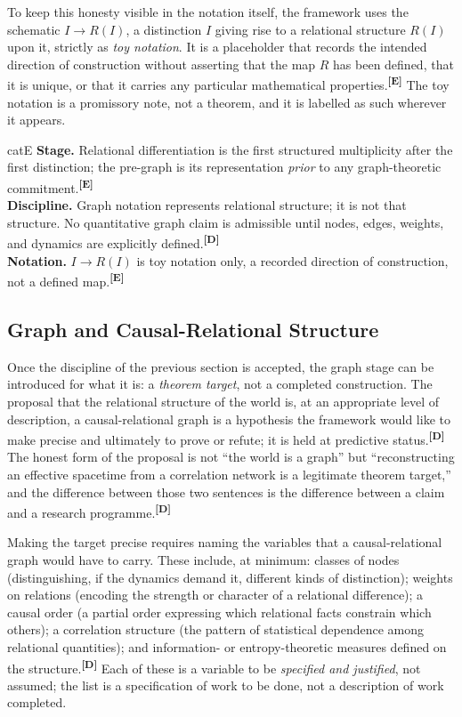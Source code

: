 \documentclass[12pt,a4paper,twoside]{article}
\theoremstyle{plain}
\theoremstyle{definition}
\theoremstyle{remark}
\newcommand{\catmark}[1]{\textsuperscript{\textsf{\textbf{[#1]}}}}
\begin{document}
To keep this honesty visible in the notation itself, the framework uses the schematic $I \to R(I)$, a distinction $I$ giving rise to a relational structure $R(I)$ upon it, strictly as \emph{toy notation}. It is a placeholder that records the intended direction of construction without asserting that the map $R$ has been defined, that it is unique, or that it carries any particular mathematical properties.\catmark{E} The toy notation is a promissory note, not a theorem, and it is labelled as such wherever it appears.

\begin{evidencebox}{catE}
\textbf{Stage.} Relational differentiation is the first structured multiplicity after the first distinction; the pre-graph is its representation \emph{prior} to
any graph-theoretic commitment.\catmark{E}\\[0.3em]
\textbf{Discipline.} Graph notation represents relational structure; it is not that structure. No quantitative graph claim is admissible until nodes, edges,
weights, and dynamics are explicitly defined.\catmark{D}\\[0.3em]
\textbf{Notation.} $I \to R(I)$ is toy notation only, a recorded direction of construction, not a defined map.\catmark{E}
\end{evidencebox}

\subsection{Graph and Causal-Relational Structure}
\label{subsec:graph-causal}

Once the discipline of the previous section is accepted, the graph stage can be introduced for what it is: a \emph{theorem target}, not a completed construction. The proposal that the relational structure of the world is, at an appropriate level of description, a causal-relational graph is a hypothesis the framework would like to make precise and ultimately to prove or refute; it is held at predictive status.\catmark{D} The honest form of the proposal is not ``the world is a graph'' but ``reconstructing an effective spacetime from a correlation network is a legitimate theorem target,'' and the difference between those two sentences is the difference between a claim and a research programme.\catmark{D}

Making the target precise requires naming the variables that a causal-relational graph would have to carry. These include, at minimum: classes of nodes (distinguishing, if the dynamics demand it, different kinds of distinction); weights on relations (encoding the strength or character of a relational difference); a causal order (a partial order expressing which relational facts constrain which others); a correlation structure (the pattern of statistical dependence among relational quantities); and information- or entropy-theoretic measures defined on the structure.\catmark{D} Each of these is a variable to be \emph{specified and justified}, not assumed; the list is a specification of work to be done, not a description of work completed.
\end{document}
